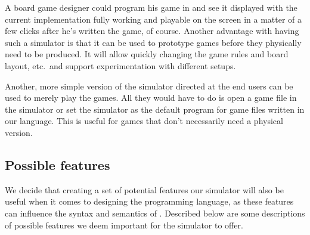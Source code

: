 A board game designer could program his game in \productname{} and see it displayed with the current implementation fully working and playable on the screen in a matter of a few clicks after he's written the game, of course. Another advantage with having such a simulator is that it can be used to prototype games before they physically need to be produced. It will allow quickly changing the game rules and board layout, etc.\ and support experimentation with different setups.

Another, more simple version of the simulator directed at the end users can be used to merely play the games. All they would have to do is open a game file in the simulator or set the simulator as the default program for game files written in our language. This is useful for games that don't necessarily need a physical version.

\subsection{Possible features}
We decide that creating a set of potential features our simulator will also be useful when it comes to designing the programming language, as these features can influence the syntax and semantics of \productname{}. Described below are some descriptions of possible features we deem important for the simulator to offer.

